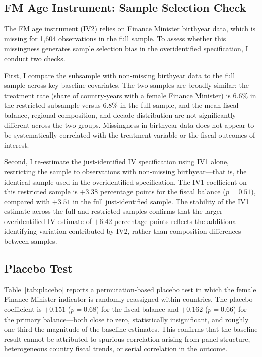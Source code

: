 \documentclass[12pt]{article}
\begin{document}
\subsection{FM Age Instrument: Sample Selection Check}

The FM age instrument (IV2) relies on Finance Minister birthyear data, which
is missing for 1,604 observations in the full sample. To assess whether this
missingness generates sample selection bias in the overidentified specification,
I conduct two checks.

First, I compare the subsample with non-missing birthyear data to the full
sample across key baseline covariates. The two samples are broadly similar:
the treatment rate (share of country-years with a female Finance Minister) is
6.6\% in the restricted subsample versus 6.8\% in the full sample, and the
mean fiscal balance, regional composition, and decade distribution are not
significantly different across the two groups. Missingness in birthyear data
does not appear to be systematically correlated with the treatment variable or
the fiscal outcomes of interest.

Second, I re-estimate the just-identified IV specification using IV1 alone,
restricting the sample to observations with non-missing birthyear---that is,
the identical sample used in the overidentified specification. The IV1
coefficient on this restricted sample is $+3.38$ percentage points for the
fiscal balance ($p = 0.51$), compared with $+3.51$ in the full just-identified
sample. The stability of the IV1 estimate across the full and restricted
samples confirms that the larger overidentified IV estimate of $+6.42$
percentage points reflects the additional identifying variation contributed by
IV2, rather than composition differences between samples.


\subsection{Placebo Test}

Table~\ref{tab:placebo} reports a permutation-based placebo test in which the 
female Finance Minister indicator is randomly reassigned within countries. 
The placebo coefficient is $+0.151$ ($p = 0.68$) for the fiscal balance and 
$+0.162$ ($p = 0.66$) for the primary balance---both close to zero, 
statistically insignificant, and roughly one-third the magnitude of the 
baseline estimates. This confirms that the baseline result cannot be attributed 
to spurious correlation arising from panel structure, heterogeneous country 
fiscal trends, or serial correlation in the outcome.
\end{document}
